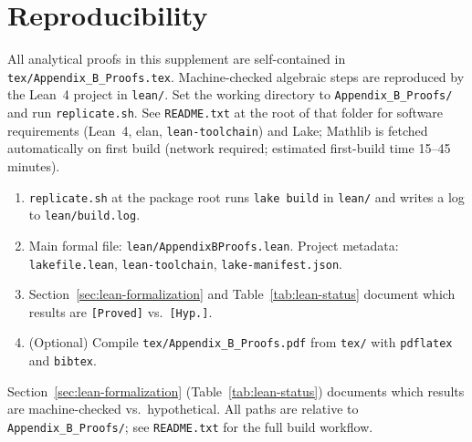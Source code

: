 \documentclass[ecta,nameyear,final,supplement]{econsocart}
\numberwithin{equation}{section}
\numberwithin{table}{section}
\theoremstyle{definition}
\begin{document}
\section{Reproducibility}
\label{sec:repro}

\begin{sloppypar}
All analytical proofs in this supplement are self-contained in
\texttt{tex/Appendix\_B\_Proofs.tex}. Machine-checked algebraic steps are reproduced by
the Lean~4 project in \texttt{lean/}. Set the working directory to
\texttt{Appendix\_B\_Proofs/} and run \texttt{replicate.sh}. See \texttt{README.txt} at the
root of that folder for software requirements (Lean~4, elan,
\texttt{lean-toolchain}) and Lake; Mathlib is fetched automatically on first
build (network required; estimated first-build time 15--45 minutes).
\end{sloppypar}

\begin{enumerate}
\item \texttt{replicate.sh} at the package root runs \texttt{lake build} in
  \texttt{lean/} and writes a log to \texttt{lean/build.log}.
\item Main formal file: \texttt{lean/AppendixBProofs.lean}. Project metadata:
  \texttt{lakefile.lean}, \texttt{lean-toolchain}, \texttt{lake-manifest.json}.
\item Section~\ref{sec:lean-formalization} and Table~\ref{tab:lean-status}
  document which results are \texttt{[Proved]} vs.\ \texttt{[Hyp.]}.
\item (Optional) Compile \texttt{tex/Appendix\_B\_Proofs.pdf} from \texttt{tex/} with
  \texttt{pdflatex} and \texttt{bibtex}.
\end{enumerate}

\begin{sloppypar}
Section~\ref{sec:lean-formalization} (Table~\ref{tab:lean-status}) documents
which results are machine-checked vs.\ hypothetical. All paths are relative to
\texttt{Appendix\_B\_Proofs/}; see \texttt{README.txt} for the full build workflow.
\end{sloppypar}



\end{document}
